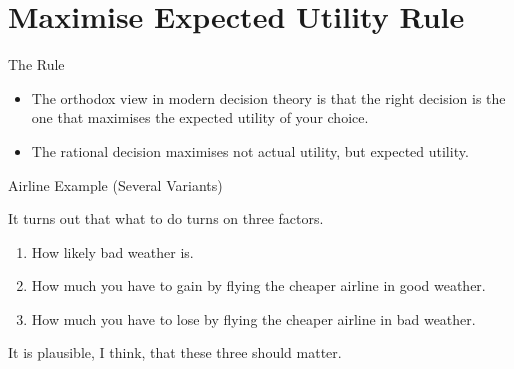 \documentclass[
  ignorenonframetext,
]{beamer}
\providecommand{\tightlist}{%
  \setlength{\itemsep}{0pt}\setlength{\parskip}{0pt}}
\renewcommand{\,}{\text{, }}
\begin{document}
\hypertarget{maximise-expected-utility-rule}{%
\section{Maximise Expected Utility
Rule}\label{maximise-expected-utility-rule}}

\begin{frame}{The Rule}
\protect\hypertarget{the-rule}{}

\begin{itemize}
\tightlist
\item
  The orthodox view in modern decision theory is that the right decision
  is the one that maximises the expected utility of your choice.
\item
  The rational decision maximises not actual utility, but expected
  utility.
\end{itemize}

\end{frame}

\begin{frame}{Airline Example (Several Variants)}
\protect\hypertarget{airline-example-several-variants}{}

It turns out that what to do turns on three factors.

\begin{enumerate}
\tightlist
\item
  How likely bad weather is.
\item
  How much you have to gain by flying the cheaper airline in good
  weather.
\item
  How much you have to lose by flying the cheaper airline in bad
  weather.
\end{enumerate}

It is plausible, I think, that these three should matter.

\end{frame}
\end{document}
